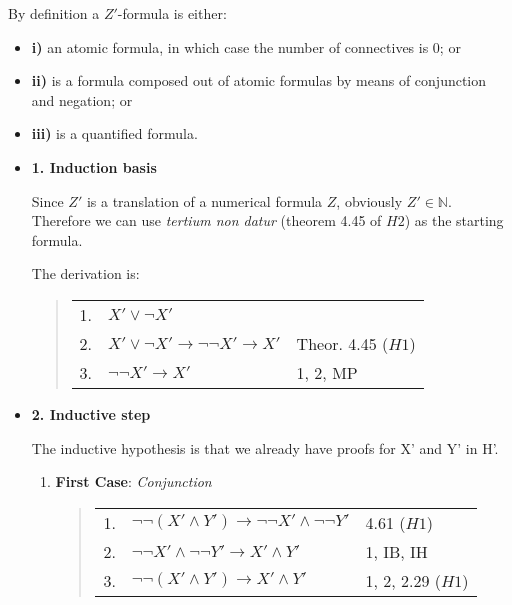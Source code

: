 \documentclass[12pt]{article}
\begin{document}
By definition a $Z'$-formula is either:

\begin{itemize}
\item \textbf{i)} an atomic formula, in which case the number of connectives is 0; or

\item \textbf{ii)} is a formula composed out of atomic formulas by means of conjunction and negation; or

\item \textbf{iii)} is a quantified formula.
\end{itemize}

\begin{itemize}
\item \textbf{1. Induction basis}

Since $Z'$ is a translation of a numerical formula $Z$, obviously $Z' \in \mathbb{N}$. Therefore we can use \emph{tertium non datur} (theorem 4.45 of $H2$) as the starting formula.

The derivation is:                                               

\begin{quote}
\begin{tabular}{lll}
1.&$X' \vee \neg X'$&\\
2.&$X' \vee \neg X' \rightarrow \neg \neg X' \rightarrow X'$&Theor. 4.45 ($H1$)\\
3.&$\neg \neg X' \rightarrow X'$&1, 2, MP
\end{tabular}
\end{quote}  

\item \textbf{2. Inductive step}

The inductive hypothesis is that we already have proofs for X' and Y' in H'. 

\begin{enumerate}

\item \textbf{First Case}: \emph{Conjunction}

\begin{quote}
\begin{tabular}{lll}
1.&$\neg \neg (X' \wedge Y') \rightarrow \neg \neg X' \wedge \neg \neg Y'$&4.61 ($H1$)\\
2.&$\neg \neg X' \wedge \neg \neg Y' \rightarrow X' \wedge Y'$&1, IB, IH\\
3.&$\neg \neg (X' \wedge Y') \rightarrow X' \wedge Y'$&1, 2, 2.29 ($H1$)
\end{tabular}
\end{quote} 


\end{enumerate}
\end{itemize}
\end{document}
